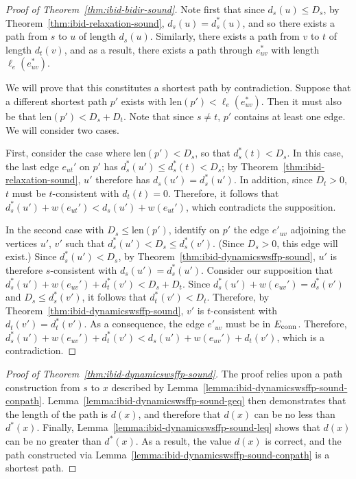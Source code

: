 \begin{proof}[Proof of Theorem~\ref{thm:ibid-bidir-sound}]
Note first that since $d_s(u) \leq D_s$,
by Theorem~\ref{thm:ibid-relaxation-sound},
$d_s(u) = d^*_s(u)$,
and so there exists a path from $s$ to $u$ of length $d_s(u)$.
Similarly, there exists a path from $v$ to $t$ of length $d_t(v)$,
and as a result,
there exists a path through $e^*_{uv}$ with length $\ell_e(e^*_{uv})$.

We will prove that this constitutes a shortest path by contradiction.
Suppose that a different shortest path $p'$ exists with
$\mbox{len}(p') < \ell_e(e^*_{uv})$.
Then it must also be that
$\mbox{len}(p') < D_s + D_t$.
Note that since $s \neq t$, $p'$ contains at least one edge.
We will consider two cases.

First, consider the case where $\mbox{len}(p') < D_s$,
so that $d_s^*(t) < D_s$.
In this case,
the last edge $e_{ut}'$ on $p'$
has $d_s^*(u') \leq d_s^*(t) < D_s$;
by Theorem~\ref{thm:ibid-relaxation-sound},
$u'$ therefore has $d_s(u') = d_s^*(u')$.
In addition,
since $D_t > 0$,
$t$ must be $t$-consistent with $d_t(t) = 0$.
Therefore,
it follows that $d_s^*(u') + w(e_{ut}') < d_s(u') + w(e_{ut}')$,
which contradicts the supposition.

In the second case with $D_s \leq \mbox{len}(p')$,
identify on $p'$ the edge $e'_{uv}$ adjoining the vertices $u'$, $v'$
such that $d_s^*(u') < D_s \leq d_s^*(v')$.
(Since $D_s > 0$, this edge will exist.)
Since $d_s^*(u') < D_s$,
by Theorem~\ref{thm:ibid-dynamicswsffp-sound},
$u'$ is therefore $s$-consistent with $d_s(u') = d_s^*(u')$.
Consider our supposition that
$d_s^*(u') + w(e_{uv}') + d_t^*(v') < D_s + D_t$.
Since $d_s^*(u') + w(e_{uv}') = d_s^*(v')$
and $D_s \leq d_s^*(v')$,
it follows that
$d_t^*(v') < D_t$.
Therefore,
by Theorem~\ref{thm:ibid-dynamicswsffp-sound},
$v'$ is $t$-consistent with $d_t(v') = d_t^*(v')$.
As a consequence,
the edge $e'_{uv}$ must be in $E_{\mbox{\scriptsize conn}}$.
Therefore,
$d_s^*(u') + w(e_{uv}') + d_t^*(v')
   < d_s(u') + w(e_{uv}') + d_t(v')$,
which is a contradiction.
\end{proof}


\begin{proof}[Proof of Theorem~\ref{thm:ibid-dynamicswsffp-sound}]
The proof relies upon a path construction from $s$ to $x$
described by Lemma~\ref{lemma:ibid-dynamicswsffp-sound-conpath}.
Lemma~\ref{lemma:ibid-dynamicswsffp-sound-geq} then demonstrates
that the length of the path is $d(x)$,
and therefore that $d(x)$ can be no less than $d^*(x)$.
Finally,
Lemma~\ref{lemma:ibid-dynamicswsffp-sound-leq}
shows that $d(x)$ can be no greater than $d^*(x)$.
As a result,
the value $d(x)$ is correct,
and the path constructed
via Lemma~\ref{lemma:ibid-dynamicswsffp-sound-conpath}
is a shortest path.
\end{proof}

